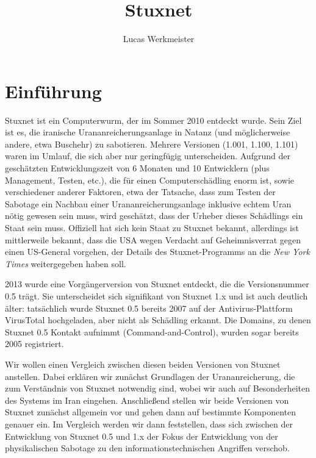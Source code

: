 \documentclass[a4paper]{article}
\title{Stuxnet}
\author{Lucas Werkmeister}
\begin{document}
\maketitle


\section{Einführung}

Stuxnet ist ein Computerwurm, der im Sommer 2010 entdeckt wurde.
Sein Ziel ist es, die iranische Urananreicherungsanlage in Natanz (und möglicherweise andere, etwa Buschehr) zu sabotieren.
Mehrere Versionen (1.001, 1.100, 1.101) waren im Umlauf, die sich aber nur geringfügig unterscheiden.
Aufgrund der geschätzten Entwicklungszeit von 6 Monaten und 10 Entwicklern (plus Management, Testen, etc.),
die für einen Computerschädling enorm ist, sowie verschiedener anderer Faktoren,
etwa der Tatsache, dass zum Testen der Sabotage ein Nachbau einer Urananreicherungsanlage inklusive echtem Uran nötig gewesen sein muss,
wird geschätzt, dass der Urheber dieses Schädlings ein Staat sein muss.
Offiziell hat sich kein Staat zu Stuxnet bekannt,
allerdings ist mittlerweile bekannt, dass die USA wegen Verdacht auf Geheimnisverrat gegen einen US-General vorgehen,
der Details des Stuxnet-Programms an die \emph{New York Times} weitergegeben haben soll\cite{wp:leak}.

2013 wurde eine Vorgängerversion von Stuxnet entdeckt, die die Versionsnummer 0.5 trägt.
Sie unterscheidet sich signifikant von Stuxnet 1.x und ist auch deutlich älter:
tatsächlich wurde Stuxnet 0.5 bereits 2007 auf der Antivirus-Plattform VirusTotal hochgeladen, aber nicht als Schädling erkannt.
Die Domains, zu denen Stuxnet 0.5 Kontakt aufnimmt (Command-and-Control), wurden sogar bereits 2005 registriert.

Wir wollen einen Vergleich zwischen diesen beiden Versionen von Stuxnet anstellen.
Dabei erklären wir zunächst Grundlagen der Urananreicherung, die zum Verständnis von Stuxnet notwendig sind,
wobei wir auch auf Besonderheiten des Systems im Iran eingehen.
Anschließend stellen wir beide Versionen von Stuxnet zunächst allgemein vor und gehen dann auf bestimmte Komponenten genauer ein.
Im Vergleich werden wir dann feststellen, dass sich zwischen der Entwicklung von Stuxnet 0.5 und 1.x
der Fokus der Entwicklung von der physikalischen Sabotage zu den informationstechnischen Angriffen verschob.
\end{document}
